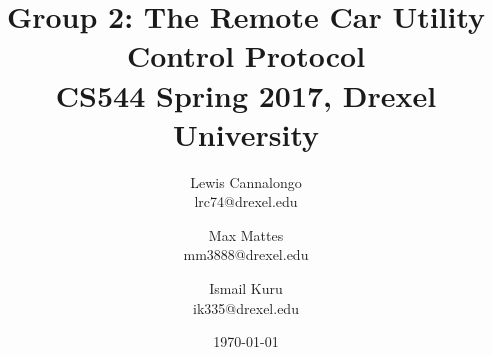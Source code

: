 \documentclass[12pt]{usenixsubmit}
\begin{document}

\title{Group 2: The Remote Car Utility Control Protocol \\ \Large{CS544 Spring 2017, Drexel University}}

\author{
    Lewis Cannalongo \\
    lrc74@drexel.edu
    \and
     Max Mattes \\
    mm3888@drexel.edu
    \and
    Ismail Kuru \\
    ik335@drexel.edu
}
\date{\today}

\maketitle

\thispagestyle{empty}



\tableofcontents
\pagebreak

\setcounter{page}{1}











%
%



%
\end{document}
